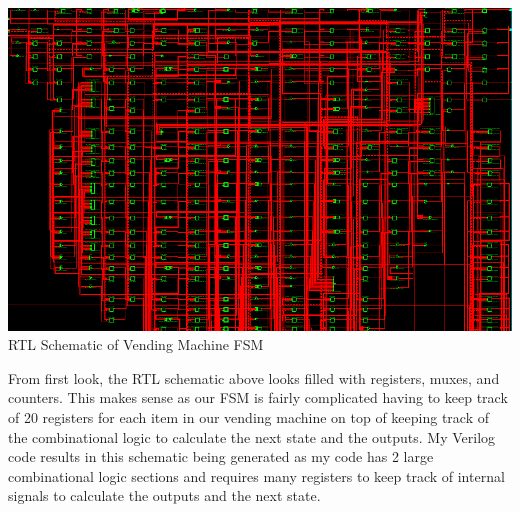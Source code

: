 \documentclass{article}
\begin{document}
\begin{center}
    \includegraphics[scale=0.4]{rtl-lab4.png} \\
    \caption{RTL Schematic of Vending Machine FSM}
\end{center} 
From first look, the RTL schematic above looks filled with registers, muxes, and counters. This makes sense as our FSM is fairly complicated having to keep track of 20 registers for each item in our vending machine on top of keeping track of the combinational logic to calculate the next state and the outputs. My Verilog code results in this schematic being generated as my code has 2 large combinational logic sections and requires many registers to keep track of internal signals to calculate the outputs and the next state.
\end{document}

